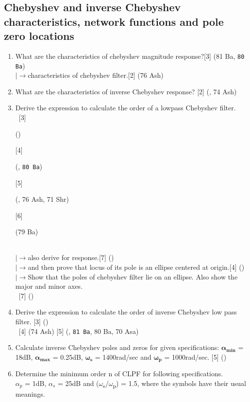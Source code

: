 \documentclass[12pt]{article}
\newcommand{\w}{\(\omega\)}
\newcommand{\lb}{\\$\left|\rightarrow\right.$}
\newcommand{\enter}{\\\textcolor{white}{1}}
\begin{document}
		\subsection{Chebyshev and inverse Chebyshev characteristics, network functions and pole zero locations}
			\begin{enumerate}
				\item What are the characteristics of chebyshev magnitude response?\hfill [3] (81 Ba, \texttt{80 Ba})
				\lb characteristics of chebyshev filter.\hfill[2] (76 Ash)

				\item What are the characteristics of inverse Chebyshev response? \hfill [2] (, 74 Ash)

				\item Derive the expression to calculate the order of a lowpass Chebyshev filter.
				\enter\hfill[3] \begin{small}()\end{small} [4] \begin{small}(, \texttt{80 Ba})\end{small} [5] \begin{small}(, 76 Ash, 71 Shr)\end{small} [6] \begin{small}(79 Ba)\end{small}
				\lb  also derive for response.\hfill[7] ()
				\lb and then prove that locus of its pole is an ellipse centered at origin.\hfill[4] ()
				\lb Show that the poles of chebyshev filter lie on an ellipse. Also show the major and minor axes.
				\enter\hfill[7] ()

				\item Derive the expression to calculate the order of inverse Chebyshev low pass filter. \hfill [3] ()
				\enter \hfill[4] (74 Ash) [5] (, \texttt{81 Ba}, 80 Ba, 70 Asa)

				\item Calculate inverse Chebyshev poles and zeros for given specifications: $\boldsymbol{\alpha_{min}}$ = 18dB, $\boldsymbol{\alpha_{max}}$ = 0.25dB, $\boldsymbol{\omega_s}$ = 1400rad/sec and $\boldsymbol{\omega_p}$ = 1000rad/sec. \hfill [5] ()

				\item Determine the  minimum order n of CLPF for following specifications.\\
				$\alpha_p$ = 1dB, $\alpha_s$ = 25dB and (\w\textsubscript{s}/\w\textsubscript{p}) = 1.5, where the symbols have their usual meanings.


\end{enumerate}
\end{document}
